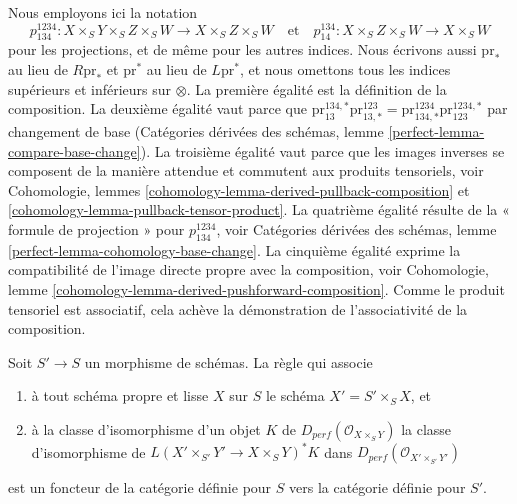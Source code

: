 Nous employons ici la notation
$$
p^{1234}_{134} : X \times_S Y \times_S Z \times_S W
\to X \times_S Z \times_S W
\quad\text{et}\quad
p^{134}_{14} : X \times_S Z \times_S W \to X \times_S W
$$
pour les projections, et de même pour les autres indices.
Nous écrivons aussi $\text{pr}_*$ au lieu de $R\text{pr}_*$ et
$\text{pr}^*$ au lieu de $L\text{pr}^*$, et nous omettons
tous les indices supérieurs et inférieurs sur $\otimes$.
La première égalité est la définition de la composition.
La deuxième égalité vaut parce que
$\text{pr}^{134, *}_{13} \text{pr}^{123}_{13, *} =
\text{pr}^{1234}_{134, *} \text{pr}^{1234, *}_{123}$
par changement de base (Catégories dérivées des schémas, lemme
\ref{perfect-lemma-compare-base-change}).
La troisième égalité vaut parce que les images inverses se composent
de la manière attendue et commutent aux produits tensoriels, voir
Cohomologie, lemmes \ref{cohomology-lemma-derived-pullback-composition} et
\ref{cohomology-lemma-pullback-tensor-product}.
La quatrième égalité résulte de la « formule de projection » pour
$p^{1234}_{134}$, voir Catégories dérivées des schémas, lemme
\ref{perfect-lemma-cohomology-base-change}.
La cinquième égalité exprime la compatibilité de l'image directe propre
avec la composition, voir
Cohomologie, lemme \ref{cohomology-lemma-derived-pushforward-composition}.
Comme le produit tensoriel est associatif,
cela achève la démonstration de l'associativité de la composition.

\begin{lemma}
\label{lemma-base-change-is-functor}
Soit $S' \to S$ un morphisme de schémas.
La règle qui associe
\begin{enumerate}
\item à tout schéma propre et lisse $X$ sur $S$ le schéma $X' =  S' \times_S X$, et
\item à la classe d'isomorphisme d'un objet $K$
de $D_{perf}(\mathcal{O}_{X \times_S Y})$ la classe d'isomorphisme de
$L(X' \times_{S'} Y' \to X \times_S Y)^*K$
dans $D_{perf}(\mathcal{O}_{X' \times_{S'} Y'})$
\end{enumerate}
est un foncteur de la catégorie définie pour $S$ vers la catégorie
définie pour $S'$.
\end{lemma}

